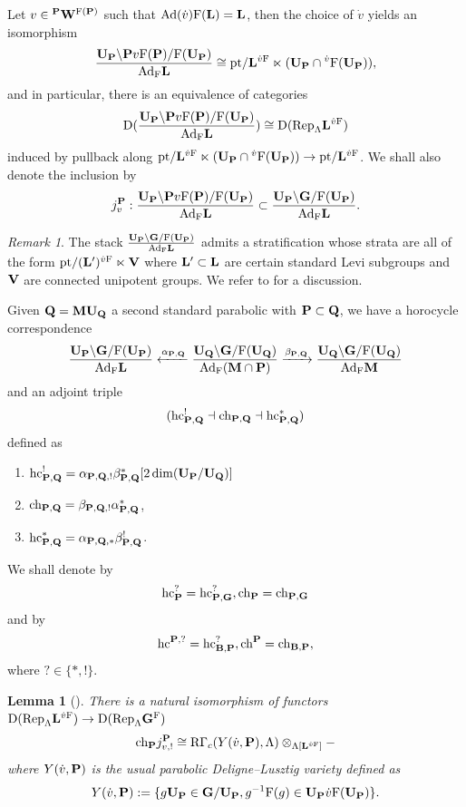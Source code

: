 \documentclass[article, 10pt, oneside, reqno]{amsart}
\theoremstyle{plain}
\newtheorem{lem}[thm]{Lemma}
\theoremstyle{definition}
\theoremstyle{remark}
\newtheorem{rque}[thm]{Remark}
\begin{document}
Let $v \in {^\Pbf}\Wbf^{\Frob(\Pbf)}$ such that $\Ad(\dot{v})\Frob(\Lbf) = \Lbf$, then the choice of $\dot{v}$ yields an isomorphism 
$$\frac{\UP \backslash \Pbf v\Frob(\Pbf)/\Frob(\UP)}{\Ad_{\Frob}\Lbf} \cong \pt/\Lbf^{\dot{v}\Frob} \ltimes (\UP \cap {^{\dot{v}}}\Frob(\UP)),$$
and in particular, there is an equivalence of categories 
$$\DD(\frac{\UP \backslash \Pbf v\Frob(\Pbf)/\Frob(\UP)}{\Ad_{\Frob}\Lbf}) \cong \DD(\Rep_{\Lambda}\Lbf^{\dot{v}\Frob})$$
induced by pullback along $\pt/\Lbf^{\dot{v}\Frob} \ltimes (\UP \cap {^{\dot{v}}}\Frob(\UP)) \to \pt/\Lbf^{\dot{v}\Frob}$. We shall also denote the inclusion by 
$$j_v^{\Pbf} : \frac{\UP \backslash \Pbf v\Frob(\Pbf)/\Frob(\UP)}{\Ad_{\Frob}\Lbf}  \subset  \frac{\UP \backslash \Gbf/\Frob(\UP)}{\Ad_{\Frob}\Lbf}.$$

\begin{rque}
The stack $\frac{\UP \backslash \Gbf/\Frob(\UP)}{\Ad_{\Frob}\Lbf}$ admits a stratification whose strata are all of the form $\pt/(\Lbf')^{\dot{v}\Frob}\ltimes \Vbf$ where $\Lbf'\subset \Lbf$ are certain standard Levi subgroups and $\Vbf$ are connected unipotent groups. We refer to \cite[Section 4.2]{EteveJordan} for a discussion. 
\end{rque}

Given $\Qbf = \Mbf\UQ$ a second standard parabolic with $\Pbf \subset \Qbf$, we have a horocycle correspondence 
$$\frac{\UP \backslash \Gbf/\Frob(\UP)}{\Ad_{\Frob}\Lbf} \xleftarrow{\alpha_{\Pbf,\Qbf}} \frac{\UQ \backslash \Gbf/\Frob(\UQ)}{\Ad_{\Frob}(\Mbf\cap \Pbf)} \xrightarrow{\beta_{\Pbf, \Qbf}} \frac{\UQ \backslash \Gbf/\Frob(\UQ)}{\Ad_{\Frob}\Mbf}$$
and an adjoint triple 
$$(\hc_{\Pbf,\Qbf}^! \dashv \ch_{\Pbf, \Qbf} \dashv \hc^*_{\Pbf, \Qbf})$$
defined as 
\begin{enumerate}
\item $\hc_{\Pbf,\Qbf}^! = \alpha_{\Pbf, \Qbf,!}\beta_{\Pbf,\Qbf}^*[2\dim(\UP/\UQ)]$
\item $\ch_{\Pbf,\Qbf} = \beta_{\Pbf, \Qbf,!}\alpha_{\Pbf,\Qbf}^*$,
\item $\hc_{\Pbf,\Qbf}^* = \alpha_{\Pbf, \Qbf,*}\beta_{\Pbf,\Qbf}^!$.
\end{enumerate}  
We shall denote by 
$$\hc_{\Pbf}^? = \hc_{\Pbf,\Gbf}^?, \ch_{\Pbf} = \ch_{\Pbf,\Gbf}$$
and by 
$$\hc^{\Pbf,?} = \hc_{\Bbf,\Pbf}^?, \ch^{\Pbf} = \ch_{\Bbf,\Pbf},$$
where $?\in\{*,!\}$.

\begin{lem}[]\label{lem:comparison-with-dl-parabolic}
There is a natural isomorphism of functors $\DD(\Rep_{\Lambda}\Lbf^{\dot{v}\Frob}) \to \DD(\Rep_{\Lambda}\Gbf^{\Frob})$ 
$$\ch_{\Pbf}j_{v,!}^{\Pbf} \cong \RGamma_c(Y(\dot{v}, \Pbf), \Lambda) \otimes_{\Lambda[\Lbf^{\dot{v}\Frob}]} - $$
where $Y(\dot{v}, \Pbf)$ is the usual parabolic Deligne--Lusztig variety defined as 
$$Y(\dot{v}, \Pbf) := \{g\UP \in \Gbf/\UP, g^{-1}\Frob(g) \in \UP \dot{v}\Frob(\UP)\}.$$
\end{lem}
\end{document}
